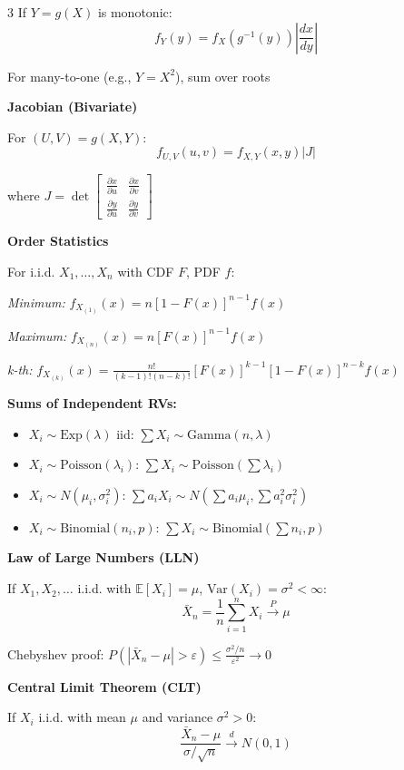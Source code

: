 \documentclass[10pt,letterpaper]{article}
\newcommand{\Var}{\text{Var}}
\newcommand{\E}{\mathbb{E}}
\begin{document}
\begin{multicols}{3}
If $Y = g(X)$ is monotonic:
$$f_Y(y) = f_X(g^{-1}(y))\left|\frac{dx}{dy}\right|$$

For many-to-one (e.g., $Y = X^2$), sum over roots

\textbf{Jacobian (Bivariate)}

For $(U,V) = g(X,Y)$:
$$f_{U,V}(u,v) = f_{X,Y}(x,y) |J|$$

where $J = \det\left[\begin{matrix}\frac{\partial x}{\partial u} & \frac{\partial x}{\partial v} \\ \frac{\partial y}{\partial u} & \frac{\partial y}{\partial v}\end{matrix}\right]$

\textbf{Order Statistics}

For i.i.d. $X_1, \ldots, X_n$ with CDF $F$, PDF $f$:

\textit{Minimum:} $f_{X_{(1)}}(x) = n[1-F(x)]^{n-1} f(x)$

\textit{Maximum:} $f_{X_{(n)}}(x) = n[F(x)]^{n-1} f(x)$

\textit{k-th:} $f_{X_{(k)}}(x) = \frac{n!}{(k-1)!(n-k)!} [F(x)]^{k-1} [1-F(x)]^{n-k} f(x)$

\textbf{Sums of Independent RVs:}
\begin{itemize}
\item $X_i \sim \text{Exp}(\lambda)$ iid: $\sum X_i \sim \text{Gamma}(n, \lambda)$
\item $X_i \sim \text{Poisson}(\lambda_i)$: $\sum X_i \sim \text{Poisson}(\sum \lambda_i)$
\item $X_i \sim N(\mu_i, \sigma_i^2)$: $\sum a_i X_i \sim N(\sum a_i\mu_i, \sum a_i^2\sigma_i^2)$
\item $X_i \sim \text{Binomial}(n_i, p)$: $\sum X_i \sim \text{Binomial}(\sum n_i, p)$
\end{itemize}

\vspace{2mm}
\vspace{0.5mm}

\textbf{Law of Large Numbers (LLN)}

If $X_1, X_2, \ldots$ i.i.d. with $\E[X_i] = \mu$, $\Var(X_i) = \sigma^2 < \infty$:
$$\bar{X}_n = \frac{1}{n}\sum_{i=1}^n X_i \xrightarrow{P} \mu$$

Chebyshev proof: $P(|\bar{X}_n - \mu| > \varepsilon) \le \frac{\sigma^2/n}{\varepsilon^2} \to 0$

\textbf{Central Limit Theorem (CLT)}

If $X_i$ i.i.d. with mean $\mu$ and variance $\sigma^2 > 0$:
$$\frac{\bar{X}_n - \mu}{\sigma/\sqrt{n}} \xrightarrow{d} N(0,1)$$


\end{multicols}
\end{document}
